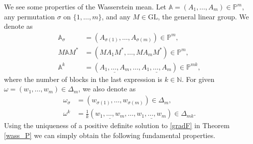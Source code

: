 \documentclass[12pt,reqno]{amsart}
\begin{document}
We see some properties of the Wasserstein mean. Let $\mathbb{A} = (A_{1}, \dots, A_{m}) \in \mathbb{P}^{m}$, any permutation $\sigma$ on $\{ 1, \dots, m \}$, and any $M \in \mathrm{GL}$, the general linear group. We denote as
\begin{displaymath}
\begin{split}
\mathbb{A}_{\sigma} & = (A_{\sigma(1)}, \dots, A_{\sigma(m)}) \in \mathbb{P}^{m}, \\
M \mathbb{A} M^{*} & = (M A_{1} M^{*}, \dots, M A_{m} M^{*}) \in \mathbb{P}^{m}, \\
\mathbb{A}^{k} & = (\underline{A_{1}, \dots, A_{m}}, \dots,
\underline{A_{1}, \dots, A_{m}}) \in \mathbb{P}^{mk},
\end{split}
\end{displaymath}
where the number of blocks in the last expression is $k \in \mathbb{N}$. For given $\omega = (w_{1}, \dots, w_{m}) \in \Delta_{m}$, we also denote as
\begin{displaymath}
\begin{split}
\omega_{\sigma} & = (w_{\sigma(1)}, \dots, w_{\sigma(m)}) \in \Delta_{m}, \\
\omega^{k} & = \frac{1}{k} (\underline{w_{1}, \dots, w_{m}}, \dots,
\underline{w_{1}, \dots, w_{m}}) \in \Delta_{mk}.
\end{split}
\end{displaymath}
Using the uniqueness of a positive definite solution to \eqref{gradF} in Theorem \ref{wass_P} we can simply obtain the following fundamental properties.
\end{document}
